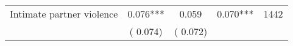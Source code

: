 \begin{tabular}{l*{4}{c}}
 Intimate partner violence &              0.076*** &         0.059 &           0.070*** & 1442                       \\  
                 &        (       0.074)                   &        (       0.072)                        &                                                             &                                                      \\      

\hline \end{tabular}                                                                                                              
